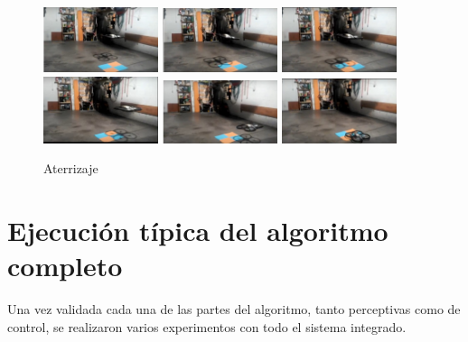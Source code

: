 \begin{figure}[H]
 \centering
    \includegraphics[width=0.30\textwidth]{imgs/aterrizaje_real1.jpg}
    \includegraphics[width=0.30\textwidth]{imgs/aterrizaje_real2.jpg}
    \includegraphics[width=0.30\textwidth]{imgs/aterrizaje_real3.jpg}\\
    \includegraphics[width=0.30\textwidth]{imgs/aterrizaje_real4.jpg}
    \includegraphics[width=0.30\textwidth]{imgs/aterrizaje_real5.jpg}
    \includegraphics[width=0.30\textwidth]{imgs/aterrizaje_real6.jpg}
 \caption{Aterrizaje}
 \label{f:Aterrizaje con el drone real.}
\end{figure}


\section{Ejecuci\'on t\'ipica del algoritmo completo}\label{sec.algoritmocompleto}
\hspace{1cm} Una vez validada cada una de las partes del algoritmo, tanto perceptivas como de control, se realizaron varios experimentos con todo el sistema integrado.

